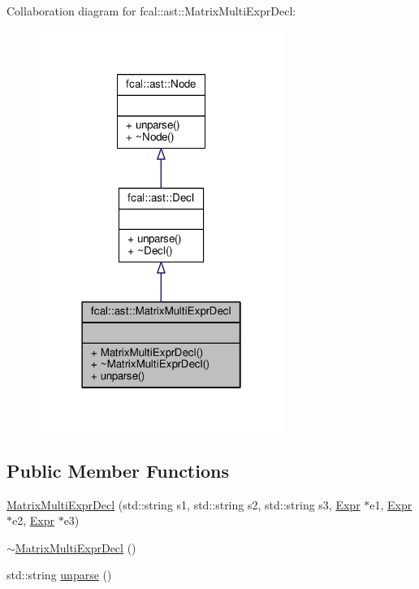 Collaboration diagram for fcal\+:\+:ast\+:\+:Matrix\+Multi\+Expr\+Decl\+:
\nopagebreak
\begin{figure}[H]
\begin{center}
\leavevmode
\includegraphics[width=226pt]{classfcal_1_1ast_1_1MatrixMultiExprDecl__coll__graph}
\end{center}
\end{figure}
\subsection*{Public Member Functions}
\begin{DoxyCompactItemize}
\item 
\hyperlink{classfcal_1_1ast_1_1MatrixMultiExprDecl_a4d605659e942bedd10628add5afb6a32}{Matrix\+Multi\+Expr\+Decl} (std\+::string s1, std\+::string s2, std\+::string s3, \hyperlink{classfcal_1_1ast_1_1Expr}{Expr} $\ast$e1, \hyperlink{classfcal_1_1ast_1_1Expr}{Expr} $\ast$e2, \hyperlink{classfcal_1_1ast_1_1Expr}{Expr} $\ast$e3)
\item 
\hyperlink{classfcal_1_1ast_1_1MatrixMultiExprDecl_a09643c70e1664f5bbaa2a06acc5d1b06}{$\sim$\+Matrix\+Multi\+Expr\+Decl} ()
\item 
std\+::string \hyperlink{classfcal_1_1ast_1_1MatrixMultiExprDecl_abb442f53c459332a7168f2153b3f11e9}{unparse} ()
\end{DoxyCompactItemize}


